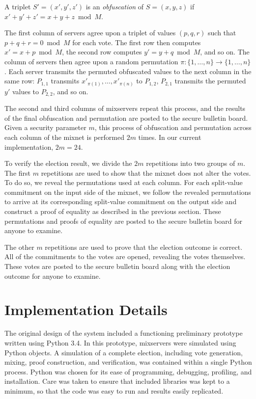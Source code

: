 \begin{definition}
A triplet $S' = (x', y', z')$ is an \emph{obfuscation} of $S = (x, y, z)$ if $x'+y'+z' = x+y+z \bmod M$.
\end{definition}

The first column of servers agree upon a triplet of values $(p, q, r)$ such that $p + q + r = 0 \bmod M$ for each vote. The first row then computes $x' = x+p \bmod M$, the second row computes $y' = y+q \bmod M$, and so on. The column of servers then agree upon a random permutation $\pi : \{1, \dotsc, n\} \to \{1, \dotsc, n\}$. Each server transmits the permuted obfuscated values to the next column in the same row: $P_{1,1}$ transmits $x'_{\pi(1)}, \dotsc, x'_{\pi(n)}$ to $P_{1,2}$, $P_{2,1}$ transmits the permuted $y'$ values to $P_{2,2}$, and so on.

The second and third columns of mixservers repeat this process, and the results of the final obfuscation and permutation are posted to the secure bulletin board. Given a security parameter $m$, this process of obfuscation and permutation across each column of the mixnet is performed $2m$ times. In our current implementation, $2m = 24$.

To verify the election result, we divide the $2m$ repetitions into two groups of $m$. The first $m$ repetitions are used to show that the mixnet does not alter the votes. To do so, we reveal the permutations used at each column. For each split-value commitment on the input side of the mixnet, we follow the revealed permutations to arrive at its corresponding split-value commitment on the output side and construct a proof of equality as described in the previous section. These permutations and proofs of equality are posted to the secure bulletin board for anyone to examine.

The other $m$ repetitions are used to prove that the election outcome is correct. All of the commitments to the votes are opened, revealing the votes themselves. These votes are posted to the secure bulletin board along with the election outcome for anyone to examine.

\section{Implementation Details}

The original design of the system included a functioning preliminary prototype written using Python 3.4. In this prototype, mixservers were simulated using Python objects. A simulation of a complete election, including vote generation, mixing, proof construction, and verification, was contained within a single Python process. Python was chosen for its ease of programming, debugging, profiling, and installation. Care was taken to ensure that included libraries was kept to a minimum, so that the code was easy to run and results easily replicated.

